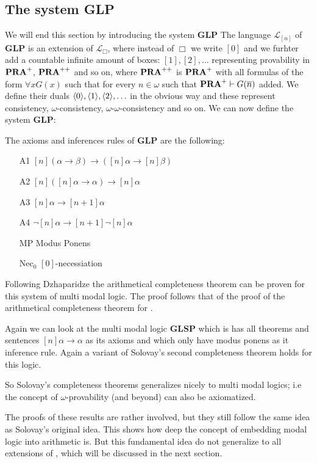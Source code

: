 \documentclass[../main.tex]{subfiles}
\begin{document}
\subsection{The system \textbf{GLP}}
We will end this section by introducing the system \textbf{GLP}
The language $\mathcal{L}_{[n]}$ of \textbf{GLP} is an extension of
$\mathcal{L}_\Box$, where instead of $\Box$ we write $[0]$ and we furhter add
a countable infinite amount of boxes:
$[1],[2],\ldots$ representing provability in $\text{\textbf{PRA}}^+$, $\text{\textbf{PRA}}^{++}$ and so on,
where $\text{\textbf{PRA}}^{++}$ is  $\text{\textbf{PRA}}^+$ with all formulas of the form $\forall x G(x)$
such that for every $n\in\omega$ such that $\text{\textbf{PRA}}^+\vdash G(\overline n)$ added. We
define their duals $\langle 0\rangle,\langle 1\rangle, \langle 2\rangle,\ldots$ in the obvious way and
these represent consistency, $\omega$-consistency,
$\omega$-$\omega$-consistency and so on. We can now define the system
\textbf{GLP}:
\begin{defi}
	The axioms and inferences rules of \textbf{GLP} are the following:
	\begin{enumerate}
		\item[A1]
			$[n](\alpha\rightarrow\beta)\rightarrow([n]\alpha\rightarrow[n]\beta)$
		\item[A2] $[n]([n]\alpha\rightarrow\alpha)\rightarrow[n]\alpha$
		\item[A3] $[n]\alpha\rightarrow[n+1]\alpha$
		\item[A4] $\neg[n]\alpha\rightarrow[n+1]\neg[n]\alpha$
		\item[MP] Modus Ponens
		\item[Nec$_0$] $[0]$-necessiation
	\end{enumerate}
\end{defi}

Following Dzhaparidze the arithmetical completeness theorem can be proven for
this system of multi modal logic. The proof follows that of the proof of the
arithmetical completeness theorem for \GLB.

Again we can look at the multi modal logic \textbf{GLSP} which is has all
theorems and sentences $[n]\alpha\rightarrow\alpha$ as its axioms and which
only have modus ponens as it inference rule. Again a variant of Solovay's
second completeness theorem holds for this logic.

So Solovay's completeness theorems generalizes nicely to multi modal logics;
i.e the concept of $\omega$-provability (and beyond) can also be axiomatized.

The proofs of these results are rather involved, but they still follow the same
idea as Solovay's original idea. This shows how deep the concept of embedding
modal logic into arithmetic is. But this fundamental idea do not generalize to
all extensions of \GL, which will be discussed in the next section.
\end{document}
